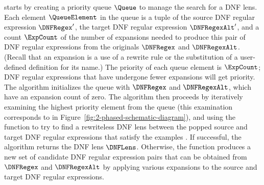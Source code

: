 \documentclass[acmsmall,screen]{acmart}
\begin{document}
\SynthDNFLens{} starts by creating a priority queue $\Queue$ to manage
the search for a DNF lens.  Each element $\QueueElement$  in the queue
is a tuple of 
the source DNF regular expression $\DNFRegex'$, 
the target DNF regular expression $\DNFRegexAlt'$, 
and a count $\ExpCount$ of the number
of expansions needed to produce this pair of DNF
regular expressions from the originals $\DNFRegex$ and
$\DNFRegexAlt$.  (Recall that an expansion is a 
use of a rewrite rule or the substitution of a user-defined
definition for its name.) The priority of each queue element is $\ExpCount$; DNF regular
expressions that have undergone fewer expansions will get priority.
The algorithm initializes the queue with
$\DNFRegex$ and $\DNFRegexAlt$, which have an expansion count of
zero.  The algorithm then proceeds by iteratively examining the
highest priority element from the queue (this examination corresponds to
\TypeProp{} in Figure~\ref{fig:2-phased-schematic-diagram}), and using the 
function \RigidSynth{} to try to find a rewriteless DNF lens
between the popped source and target DNF regular expressions that satisfy
the examples \Examples{}.  If successful, the algorithm returns the
DNF lens $\DNFLens$.  Otherwise, the function \Expand{} produces
a new set of candidate DNF regular expression pairs that can
be obtained from $\DNFRegex$ and $\DNFRegexAlt$ by
applying various expansions to the source and target DNF regular
expressions.
\end{document}
